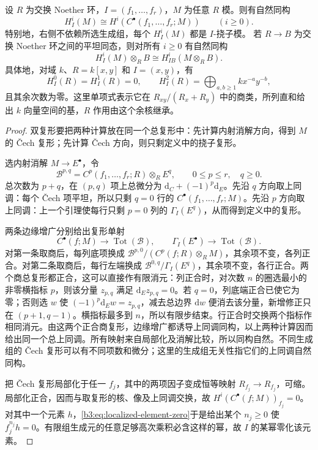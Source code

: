 \begin{theorem}\label{b3:thm:cech-local-cohomology}
	设 \(R\) 为交换 Noether 环，\(I=(f_1,\ldots,f_r)\)，\(M\) 为任意 \(R\) 模。则有自然同构
	\[
		H_I^i(M)\cong H^i(C^\bullet(f_1,\ldots,f_r;M))\qquad(i\ge0).
	\]
	特别地，右侧不依赖所选生成组，每个 \(H_I^i(M)\) 都是 \(I\)-挠子模。 若 \(R\to B\) 为交换 Noether 环之间的平坦同态，则对所有 \(i\ge0\) 有自然同构
	\[
		H_I^i(M)\otimes_RB\cong H_{IB}^i(M\otimes_RB).
	\]
	具体地，对域 \(k\)、\(R=k[x,y]\) 和 \(I=(x,y)\)，有
	\[
		H_I^0(R)=H_I^1(R)=0,\qquad H_I^2(R)=\bigoplus_{a,b\ge1}k x^{-a}y^{-b},
	\]
	且其余次数为零。这里单项式表示它在 \(R_{xy}/(R_x+R_y)\) 中的商类，所列直和给出 \(k\) 向量空间的基，\(R\) 作用由这个余核继承。
\end{theorem}
\begin{proof}
	双复形要把两种计算放在同一个总复形中：先计算内射消解方向，得到 \(M\) 的 Čech 复形；先计算 Čech 方向，则只剩定义中的挠子复形。

	选内射消解 \(M\to E^\bullet\)，令
	\[
		\mathcal B^{p,q}=C^p(f_1,\ldots,f_r;R)\otimes_R E^q, \qquad 0\le p\le r,\quad q\ge0.
	\]
	总次数为 \(p+q\)，在 \((p,q)\) 项上总微分为 \(\mathrm{d}_C+(-1)^p\mathrm{d}_E\)。先沿 \(q\) 方向取上同调：每个 Čech 项平坦，所以只剩 \(q=0\) 行的 \(C^\bullet(f_1,\ldots,f_r;M)\)。先沿 \(p\) 方向取上同调：上一个引理使每行只剩 \(p=0\) 列的 \(\Gamma_I(E^q)\)，从而得到定义中的复形。

	两条边缘增广分别给出复形单射
	\[
		C^\bullet(f;M)\longrightarrow\operatorname{Tot}(\mathcal B),\qquad \Gamma_I(E^\bullet)\longrightarrow\operatorname{Tot}(\mathcal B).
	\]
	对第一条取商后，每列底项换成 \(\mathcal B^{p,0}/(C^p(f;R)\otimes_RM)\)，其余项不变，各列正合。对第二条取商后，每行左端换成 \(\mathcal B^{0,q}/\Gamma_I(E^q)\)，其余项不变，各行正合。两个商总复形都正合，这可以直接作有限消元：列正合时，对次数 \(n\) 的圈选最小的非零横指标 \(p\)，则该分量 \(z_{p,q}\) 满足 \(\mathrm d_Ez_{p,q}=0\)。若 \(q=0\)，列底端正合已使它为零；否则选 \(w\) 使 \((-1)^p\mathrm d_Ew=z_{p,q}\)，减去总边界 \(\mathrm dw\) 便消去该分量，新增修正只在 \((p+1,q-1)\)。横指标最多到 \(n\)，所以有限步结束。行正合时交换两个指标作相同消元。由这两个正合商复形，边缘增广都诱导上同调同构，以上两种计算因而给出同一个总上同调。所有映射来自局部化及消解比较，所以同构自然。不同生成组的 Čech 复形可以有不同项数和微分；这里的生成组无关性指它们的上同调自然同构。

	把 Čech 复形局部化于任一 \(f_j\)，其中的两项因子变成恒等映射 \(R_{f_j}\to R_{f_j}\)，可缩。局部化正合，因而与取复形的核、像及上同调交换，故 \(H^i(C^\bullet(f;M))_{f_j}=0\)。对其中一个元素 \(h\)，\eqref{b3:eq:localized-element-zero}于是给出某个 \(n_j\ge0\) 使 \(f_j^{n_j}h=0\)。有限组生成元的任意足够高次乘积必含这样的幂，故 \(I\) 的某幂零化该元素。


\end{proof}
